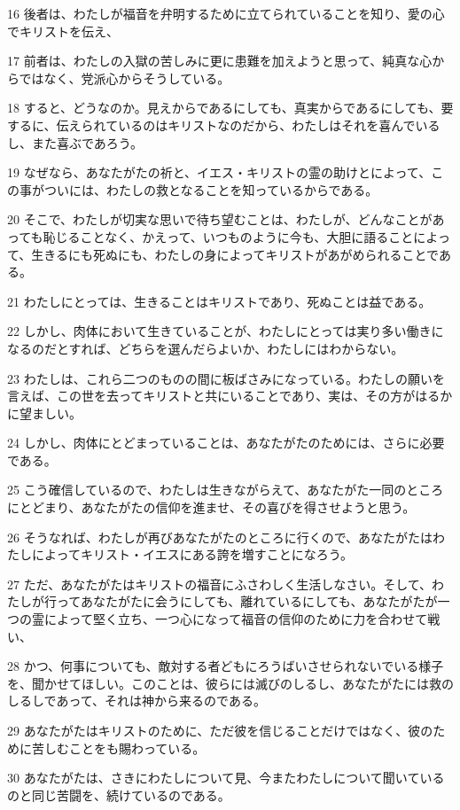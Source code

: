 \par 16 後者は、わたしが福音を弁明するために立てられていることを知り、愛の心でキリストを伝え、
\par 17 前者は、わたしの入獄の苦しみに更に患難を加えようと思って、純真な心からではなく、党派心からそうしている。
\par 18 すると、どうなのか。見えからであるにしても、真実からであるにしても、要するに、伝えられているのはキリストなのだから、わたしはそれを喜んでいるし、また喜ぶであろう。
\par 19 なぜなら、あなたがたの祈と、イエス・キリストの霊の助けとによって、この事がついには、わたしの救となることを知っているからである。
\par 20 そこで、わたしが切実な思いで待ち望むことは、わたしが、どんなことがあっても恥じることなく、かえって、いつものように今も、大胆に語ることによって、生きるにも死ぬにも、わたしの身によってキリストがあがめられることである。
\par 21 わたしにとっては、生きることはキリストであり、死ぬことは益である。
\par 22 しかし、肉体において生きていることが、わたしにとっては実り多い働きになるのだとすれば、どちらを選んだらよいか、わたしにはわからない。
\par 23 わたしは、これら二つのものの間に板ばさみになっている。わたしの願いを言えば、この世を去ってキリストと共にいることであり、実は、その方がはるかに望ましい。
\par 24 しかし、肉体にとどまっていることは、あなたがたのためには、さらに必要である。
\par 25 こう確信しているので、わたしは生きながらえて、あなたがた一同のところにとどまり、あなたがたの信仰を進ませ、その喜びを得させようと思う。
\par 26 そうなれば、わたしが再びあなたがたのところに行くので、あなたがたはわたしによってキリスト・イエスにある誇を増すことになろう。
\par 27 ただ、あなたがたはキリストの福音にふさわしく生活しなさい。そして、わたしが行ってあなたがたに会うにしても、離れているにしても、あなたがたが一つの霊によって堅く立ち、一つ心になって福音の信仰のために力を合わせて戦い、
\par 28 かつ、何事についても、敵対する者どもにろうばいさせられないでいる様子を、聞かせてほしい。このことは、彼らには滅びのしるし、あなたがたには救のしるしであって、それは神から来るのである。
\par 29 あなたがたはキリストのために、ただ彼を信じることだけではなく、彼のために苦しむことをも賜わっている。
\par 30 あなたがたは、さきにわたしについて見、今またわたしについて聞いているのと同じ苦闘を、続けているのである。

